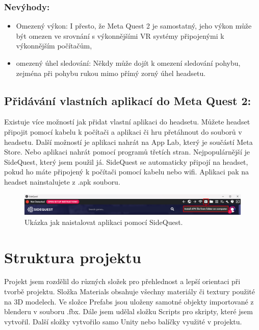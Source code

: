 \documentclass[12pt, a4paper,
twoside,        %
openright
]{report}
\begin{document}
	\subsubsection{Nevýhody:}
	\begin{itemize}
		\item Omezený výkon: I přesto, že Meta Quest 2 je samostatný, jeho výkon může být omezen ve srovnání s výkonnějšími VR systémy připojenými k výkonnějším počítačům,
		\item omezený úhel sledování: Někdy může dojít k omezení sledování pohybu, zejména při pohybu rukou mimo přímý zorný úhel headsetu.
	\end{itemize}
	
	\subsection{Přidávání vlastních aplikací do Meta Quest 2:}
	Existuje více možností jak přidat vlastní aplikaci do headsetu. Můžete headset připojit pomocí kabelu k počítači a aplikaci či hru přetáhnout do souborů v headsetu. Další možností je aplikaci nahrát na App Lab, který je součástí Meta Store. Nebo aplikaci nahrát pomocí programů třetích stran. Nejpopulárnější je SideQuest, který jsem použil já. SideQuest se automaticky připojí na headset, pokud ho máte připojený k počítači pomocí kabelu nebo wifi. Aplikaci pak na headset nainstalujete z .apk souboru.
	
	\begin{figure}[h!]
		\centering 
		\includegraphics[width=1\textwidth]{image/sidequest.png} 
		\caption{Ukázka jak naistalovat aplikaci pomocí SideQuest.} 
		\label{fig:sidequest} 
	\end{figure}

	\section{Struktura projektu}
\label{sec:struktura_projektu}
	
	Projekt jsem rozdělil do různých složek pro přehlednost a lepší orientaci při tvorbě projektu. Složka Materials obsahuje všechny materiály či textury použité na 3D modelech. Ve složce Prefabs jsou uloženy samotné objekty importované z blenderu v souboru .fbx. Dále jsem udělal složku Scripts pro skripty, které jsem vytvořil. Další složky vytvořilo samo Unity nebo balíčky využité v projektu. 
	
\end{document}
